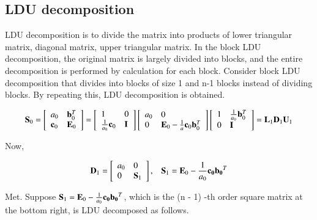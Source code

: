 \subsection{LDU decomposition}

LDU decomposition is to divide the matrix into products of lower triangular matrix, diagonal matrix, upper triangular matrix. In the block LDU decomposition, the original matrix is ​​largely divided into blocks, and the entire decomposition is performed by calculation for each block. Consider block LDU decomposition that divides into blocks of size 1 and n-1 blocks instead of dividing blocks. By repeating this, LDU decomposition is obtained.

\begin{eqnarray}
\mathbf{S}_0=\left[\begin{array}{ll}
a_0 & \mathbf{b}^T_0\\
\mathbf{c}_0 & \mathbf{E}_0
\end{array}\right]
=
\left[\begin{array}{ll}
1 & 0\\
\frac{1}{a_0}\mathbf{c}_0 & \mathbf{I}
\end{array}\right]
\left[\begin{array}{ll}
a_0 & 0\\
0 & \mathbf{E}_0 - \frac{1}{a}\mathbf{c}_0\mathbf{b}_0^T
\end{array}\right]
\left[\begin{array}{ll}
1 & \frac{1}{a_0}\mathbf{b}_0^T\\
0 & \mathbf{I}
\end{array}\right] = \mathbf{L}_1 \mathbf{D}_1 \mathbf{U}_1
\end{eqnarray}

Now,

\begin{eqnarray}
\mathbf{D}_1
= \left[\begin{array}{ll}
a_0 & 0\\
0 & \mathbf{S}_1
\end{array}\right],\;\;\;\mathbf{S}_1 = \mathbf{E}_0 - \frac{1}{a_0}\mathbf{c_0}\mathbf{b_0}^T
\end{eqnarray}

Met. Suppose $\mathbf{S}_1 =\mathbf{E}_0 - \frac{1}{a_0}\mathbf{c_0}\mathbf{b_0}^T$, which is the (n - 1) -th order square matrix at the bottom right, is LDU decomposed as follows.

